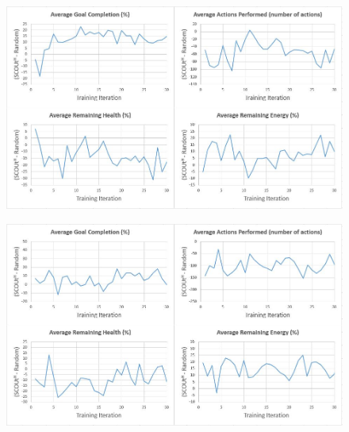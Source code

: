 \begin{appxfig}[H]
\begin{figure}[H]
  \centering
  \includegraphics[width=1.0\columnwidth]{Figures/Results/TrainingVariation1/MapWater.JPG}
\end{figure}
\caption{Iteration testing performance results for $SCOUt_{MW}$ attempting \textit{Map Water} using setup variation 1 (see subsection~\ref{subsec:training_variations}). All graphs show the controller's average difference in performance compared to $Random$ ($SCOUt_{MW}$ average - $Random$ average) VS the number of training iterations completed.}
\label{appendix:mapwater_training_variation1}
\end{appxfig}


\begin{appxfig}[H]
\begin{figure}[H]
  \centering
  \includegraphics[width=1.0\columnwidth]{Figures/Results/TrainingVariation1/Hybrid-FindHuman.JPG}
\end{figure}
\caption{Iteration testing performance results for $SCOUt_{H}$ attempting \textit{Find Human} using setup variation 1 (see subsection~\ref{subsec:training_variations}). All graphs show the controller's average difference in performance compared to $Random$ ($SCOUt_{H}$ average - $Random$ average) VS the number of training iterations completed.}
\label{appendix:hybrid_training_fh_variation1}
\end{appxfig}


